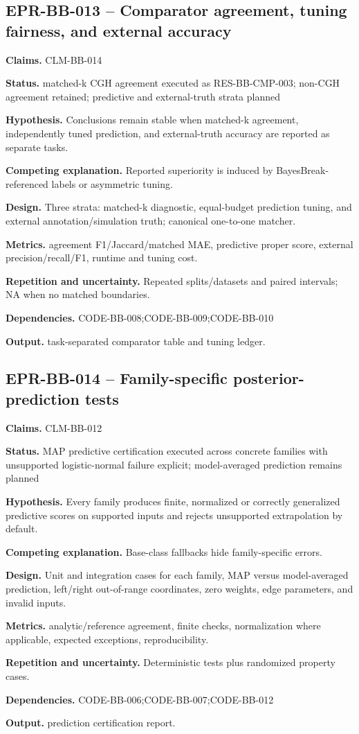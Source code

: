 \subsection{EPR-BB-013 -- Comparator agreement, tuning fairness, and external accuracy}
\textbf{Claims.} CLM-BB-014\par
\textbf{Status.} matched-k CGH agreement executed as RES-BB-CMP-003; non-CGH agreement retained; predictive and external-truth strata planned\par
\textbf{Hypothesis.} Conclusions remain stable when matched-k agreement, independently tuned prediction, and external-truth accuracy are reported as separate tasks.\par
\textbf{Competing explanation.} Reported superiority is induced by BayesBreak-referenced labels or asymmetric tuning.\par
\textbf{Design.} Three strata: matched-k diagnostic, equal-budget prediction tuning, and external annotation/simulation truth; canonical one-to-one matcher.\par
\textbf{Metrics.} agreement F1/Jaccard/matched MAE, predictive proper score, external precision/recall/F1, runtime and tuning cost.\par
\textbf{Repetition and uncertainty.} Repeated splits/datasets and paired intervals; NA when no matched boundaries.\par
\textbf{Dependencies.} CODE-BB-008;CODE-BB-009;CODE-BB-010\par
\textbf{Output.} task-separated comparator table and tuning ledger.

\subsection{EPR-BB-014 -- Family-specific posterior-prediction tests}
\textbf{Claims.} CLM-BB-012\par
\textbf{Status.} MAP predictive certification executed across concrete families with unsupported logistic-normal failure explicit; model-averaged prediction remains planned\par
\textbf{Hypothesis.} Every family produces finite, normalized or correctly generalized predictive scores on supported inputs and rejects unsupported extrapolation by default.\par
\textbf{Competing explanation.} Base-class fallbacks hide family-specific errors.\par
\textbf{Design.} Unit and integration cases for each family, MAP versus model-averaged prediction, left/right out-of-range coordinates, zero weights, edge parameters, and invalid inputs.\par
\textbf{Metrics.} analytic/reference agreement, finite checks, normalization where applicable, expected exceptions, reproducibility.\par
\textbf{Repetition and uncertainty.} Deterministic tests plus randomized property cases.\par
\textbf{Dependencies.} CODE-BB-006;CODE-BB-007;CODE-BB-012\par
\textbf{Output.} prediction certification report.


